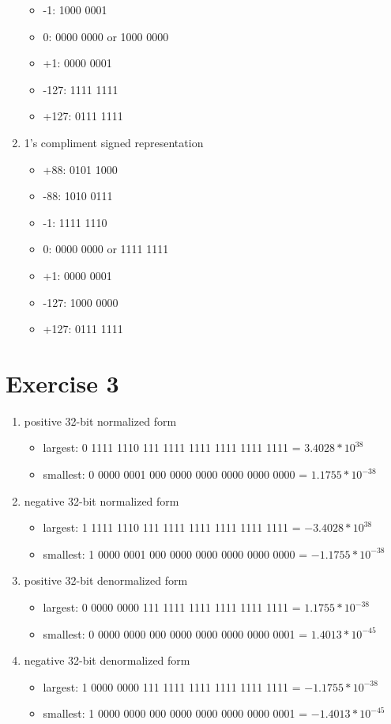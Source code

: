 \documentclass{article}
\begin{document}
\begin{enumerate}
\begin{itemize}
        \item -1: 1000 0001
        \item 0: 0000 0000 or 1000 0000
        \item +1: 0000 0001
        \item -127: 1111 1111
        \item +127: 0111 1111
    \end{itemize}
    \item 1's compliment signed representation
    \begin{itemize}
        \item +88: 0101 1000
        \item -88: 1010 0111
        \item -1: 1111 1110
        \item 0: 0000 0000 or 1111 1111
        \item +1: 0000 0001
        \item -127: 1000 0000
        \item +127: 0111 1111
    \end{itemize}
\end{enumerate}

\section{Exercise 3}
\begin{enumerate}
    \item positive 32-bit normalized form
    \begin{itemize}
        \item largest: 0 1111 1110 111 1111 1111 1111 1111 1111 = $3.4028*10^{38}$
        \item smallest: 0 0000 0001 000 0000 0000 0000 0000 0000 =  $1.1755*10^{-38}$
    \end{itemize}
    \item negative 32-bit normalized form
    \begin{itemize}
        \item largest: 1 1111 1110 111 1111 1111 1111 1111 1111 = $-3.4028*10^{38}$
        \item smallest: 1 0000 0001 000 0000 0000 0000 0000 0000 =  $-1.1755*10^{-38}$
    \end{itemize}
    \item positive 32-bit denormalized form
    \begin{itemize}
        \item largest: 0 0000 0000 111 1111 1111 1111 1111 1111 = $1.1755*10^{-38}$
        \item smallest: 0 0000 0000 000 0000 0000 0000 0000 0001 = $1.4013*10^{-45}$
    \end{itemize}
    \item negative 32-bit denormalized form
    \begin{itemize}
        \item largest: 1 0000 0000 111 1111 1111 1111 1111 1111 = $-1.1755*10^{-38}$
        \item smallest: 1 0000 0000 000 0000 0000 0000 0000 0001 = $-1.4013*10^{-45}$
    \end{itemize}
\end{enumerate}
\end{document}
